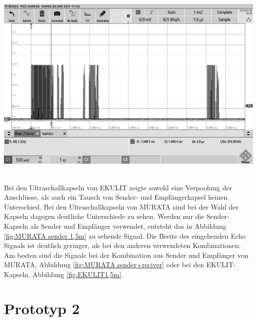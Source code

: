 \begin{minipage}{0.5\textwidth}
\includegraphics[width=1\textwidth%
]{Abbildungen/MessungenP1/MURATAsr1,5m.png}
\label{fig:MURATA sender+reciver}
\end{minipage}\\
Bei den Ultraschallkapseln von EKULIT zeigte sowohl eine Verpoolung der Anschlüsse, als auch ein Tausch von Sender- und Empfängerkapsel keinen Unterschied. Bei den Ultraschallkapseln von MURATA sind bei der Wahl der Kapseln dagegen deutliche Unterschiede zu sehen. Werden nur die Sender-Kapseln als Sender und Empfänger verwendet, entsteht das in Abbildung \ref{fig:MURATA sender 1,5m} zu sehende Signal. Die Breite des eingehenden Echo Signals ist deutlich geringer, als bei den anderen verwendeten Kombinationen. Am besten sind die Signale bei der Kombination aus Sender und Empfänger von MURATA, Abbildung \ref{fig:MURATA sender+reciver} oder bei den EKULIT-Kapseln, Abbildung \ref{fig:EKULIT1,5m}.

\section{Prototyp 2}

